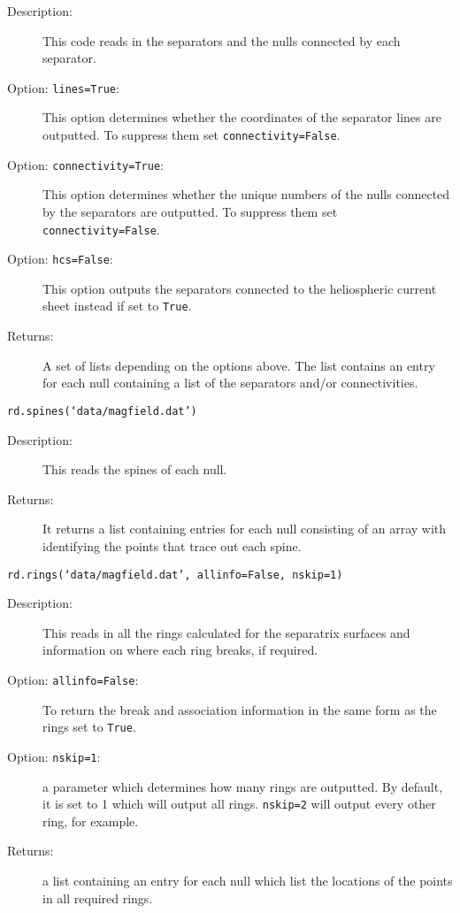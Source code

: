 \documentclass[12pt]{article}
\begin{document}
      \begin{description}
        \item [Description:] This code reads in the separators and the nulls connected by each separator.
        \item [Option: \texttt{lines=True}:] This option determines whether the coordinates of the separator lines are outputted. To suppress them set \texttt{connectivity=False}.
        \item [Option: \texttt{connectivity=True}:] This option determines whether the unique numbers of the nulls connected by the separators are outputted. To suppress them set \texttt{connectivity=False}.
        \item [Option: \texttt{hcs=False}:] This option outputs the separators connected to the heliospheric current sheet instead if set to \texttt{True}.
        \item [Returns:] A set of lists depending on the options above. The list contains an entry for each null containing a list of the separators and/or connectivities.
      \end{description}

      \texttt{rd.spines(`data/magfield.dat')}

      \begin{description}
        \item [Description:] This reads the spines of each null.
        \item [Returns:] It returns a list containing entries for each null consisting of an array with identifying the points that trace out each spine.
      \end{description}

      \texttt{rd.rings(`data/magfield.dat', allinfo=False, nskip=1)}

      \begin{description}
        \item [Description:] This reads in all the rings calculated for the separatrix surfaces and information on where each ring breaks, if required.
        \item [Option: \texttt{allinfo=False}:] To return the break and association information in the same form as the rings set to \texttt{True}.
        \item [Option: \texttt{nskip=1}:] a parameter which determines how many rings are outputted. By default, it is set to 1 which will output all rings. \texttt{nskip=2} will output every other ring, for example.
        \item [Returns:] a list containing an entry for each null which list the locations of the points in all required rings.
      \end{description}
\end{document}
